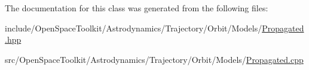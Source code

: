 The documentation for this class was generated from the following files\+:\begin{DoxyCompactItemize}
\item 
include/\+Open\+Space\+Toolkit/\+Astrodynamics/\+Trajectory/\+Orbit/\+Models/\hyperlink{_propagated_8hpp}{Propagated.\+hpp}\item 
src/\+Open\+Space\+Toolkit/\+Astrodynamics/\+Trajectory/\+Orbit/\+Models/\hyperlink{_propagated_8cpp}{Propagated.\+cpp}\end{DoxyCompactItemize}
